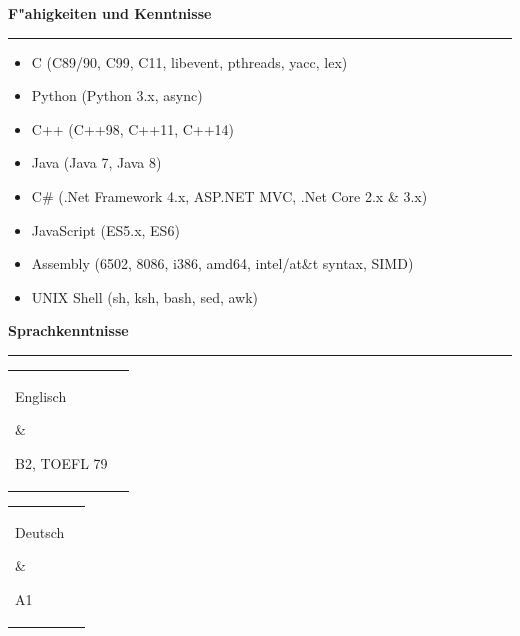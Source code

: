 \documentclass[11pt,a4paper,oneside]{article}
\makeatletter
\renewcommand{\section}[1]{%
{\large\textbf{#1}}\\
\rule[9pt]{18cm}{.4pt}\vspace{-15pt}%
}
\newenvironment{mytable}{%
\begin{tabular}{@{}l@{\hspace{4mm}}l@{}}%
}{\end{tabular}}
\newcommand{\myitem}[2]{%
\parbox[t]{16mm}{#1}&\parbox[t]{16cm}{#2}\\%
}
\makeatother
\begin{document}
\section{F"ahigkeiten und Kenntnisse}
\begin{itemize}
\item C (C89/90, C99, C11, libevent, pthreads, yacc, lex)
\item Python (Python 3.x, async)
\item C++ (C++98, C++11, C++14)
\item Java (Java 7, Java 8)
\item C\# (.Net Framework 4.x, ASP.NET MVC, .Net Core 2.x \& 3.x)
\item JavaScript (ES5.x, ES6)
\item Assembly (6502, 8086, i386, amd64, intel/at\&t syntax, SIMD)
\item UNIX Shell (sh, ksh, bash, sed, awk)
\end{itemize}

\section{Sprachkenntnisse}

\begin{mytable}\myitem{Englisch}{
	B2, TOEFL 79
}\end{mytable}

\begin{mytable}\myitem{Deutsch}{
	A1
}\end{mytable}
\end{document}
